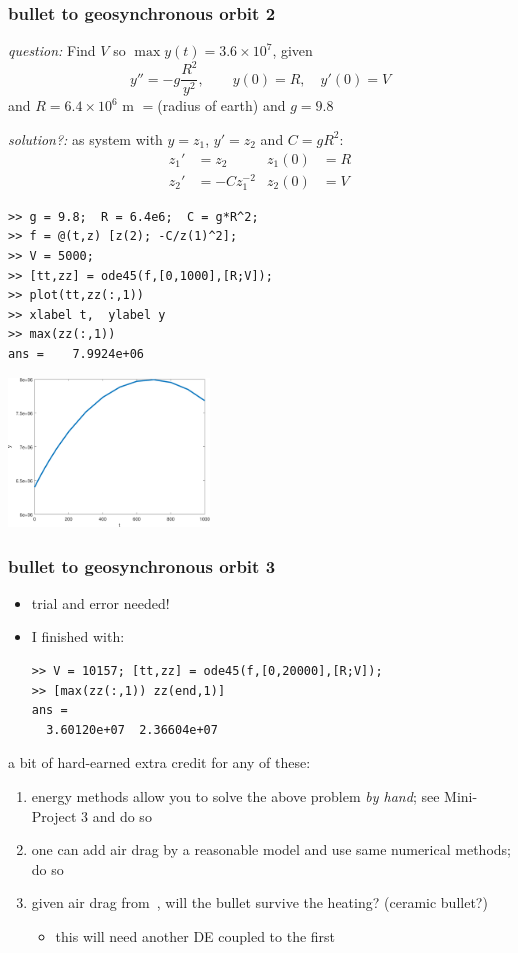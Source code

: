 \documentclass[dvipsnames,colorlinks]{beamer}
\newcommand\enumnum[1]{{\renewcommand{\insertenumlabel}{#1}%
      \usebeamertemplate{enumerate item} \,}}
\begin{document}
\begin{frame}[fragile]
\frametitle{bullet to geosynchronous orbit 2}

\small

\emph{question:} Find $V$ so $\max y(t) = 3.6\times 10^7$, given
    $$y'' = -g \frac{R^2}{y^2}, \qquad y(0)=R, \quad y'(0)=V$$
and $R=6.4\times 10^6$ m $=$(radius of earth) and $g=9.8$

\emph{solution?:} as system with $y=z_1$, $y'=z_2$ and $C=gR^2$:
\begin{align*}
z_1' &= z_2  & z_1(0)&=R \\
z_2' &= - C z_1^{-2} & z_2(0) &= V
\end{align*}

\begin{Verbatim}[fontsize=\footnotesize]
>> g = 9.8;  R = 6.4e6;  C = g*R^2;
>> f = @(t,z) [z(2); -C/z(1)^2];
>> V = 5000;
>> [tt,zz] = ode45(f,[0,1000],[R;V]);
>> plot(tt,zz(:,1))
>> xlabel t,  ylabel y
>> max(zz(:,1))
ans =    7.9924e+06
\end{Verbatim}

\vspace{-30mm}

\hfill \includegraphics[width=0.4\textwidth]{figs/firstbullet}
\end{frame}


\begin{frame}[fragile]
\frametitle{bullet to geosynchronous orbit 3}

\begin{itemize}
\item trial and error needed!
\item I finished with:
\begin{Verbatim}[fontsize=\footnotesize]
>> V = 10157; [tt,zz] = ode45(f,[0,20000],[R;V]);
>> [max(zz(:,1)) zz(end,1)]
ans =
  3.60120e+07  2.36604e+07
\end{Verbatim}
\end{itemize}

\bigskip
\small
a bit of hard-earned \alert{extra credit} for any of these:
\begin{enumerate}
\item energy methods allow you to solve the above problem \emph{by hand}; see Mini-Project 3 and do so
\item one can add air drag by a reasonable model and use same numerical methods; do so
\item given air drag from \enumnum{2}, will the bullet survive the heating? (ceramic bullet?)
    \begin{itemize}
    \item this will need another DE coupled to the first
    \end{itemize}
\end{enumerate}
\end{frame}
\end{document}
